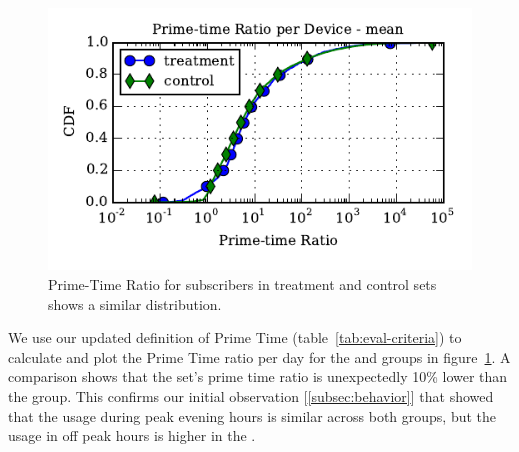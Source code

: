 \begin{figure}[t]
\begin{minipage}{\linewidth}
\centering
\includegraphics[]{figures/prime-time-ratio-per-device-cdf-MEAN.pdf}
\caption{Prime-Time Ratio for subscribers in treatment and control sets shows a 
similar distribution.  \label{fig:cdf-prime-time-ratio}}
\end{minipage}
\end{figure}

We use our updated definition of Prime Time (table~\ref{tab:eval-criteria}) to calculate and plot
the Prime Time ratio per day for the \treatment{} and \control{} groups in
figure~\ref{fig:cdf-prime-time-ratio}. A comparison shows that
the \treatment{} set's prime time ratio is unexpectedly 10\% lower than the 
\control{} group. 
This confirms our initial observation [\autoref{subsec:behavior}] that showed 
that the usage during peak evening hours is similar
across both groups, but the usage in off peak hours is higher in the \treatment{}.